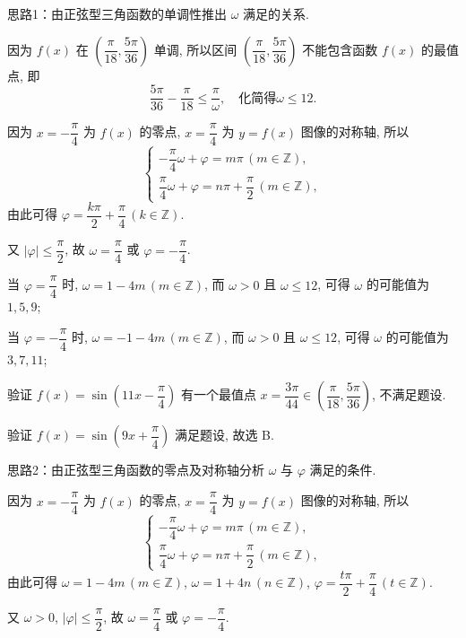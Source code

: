 \begin{solutions}
思路1：由正弦型三角函数的单调性推出 $ \omega $ 满足的关系.  

因为 $ f(x) $ 在 $ \left(\dfrac{\pi}{18},\dfrac{5\pi}{36}\right) $ 单调, 所以区间 $ \left(\dfrac{\pi}{18},\dfrac{5\pi}{36}\right) $ 不能包含函数 $ f(x) $ 的最值点, 即  
$$
\dfrac{5\pi}{36}-\dfrac{\pi}{18}\leqslant\dfrac{\pi}{\omega},\quad\text{化简得}\omega\leqslant12.
$$  

因为 $ x=-\dfrac{\pi}{4} $ 为 $ f(x) $ 的零点, $ x=\dfrac{\pi}{4} $ 为 $ y=f(x) $ 图像的对称轴, 所以  
$$
\begin{cases}
-\dfrac{\pi}{4}\omega+\varphi=m\pi\,(m\in\mathbb{Z}),\\[1em]
\dfrac{\pi}{4}\omega+\varphi=n\pi+\dfrac{\pi}{2}\,(m\in\mathbb{Z}),
\end{cases}
$$  
由此可得 $ \varphi=\dfrac{k\pi}{2}+\dfrac{\pi}{4}\,(k\in\mathbb{Z}) $.  

又 $ |\varphi|\leqslant\dfrac{\pi}{2} $, 故 $ \omega=\dfrac{\pi}{4} $ 或 $ \varphi=-\dfrac{\pi}{4} $.  

当 $ \varphi=\dfrac{\pi}{4} $ 时, $ \omega=1-4m\,(m\in\mathbb{Z}) $, 而 $ \omega>0 $ 且 $ \omega\leqslant12 $, 可得 $ \omega $ 的可能值为 $ 1,5,9 $;  

当 $ \varphi=-\dfrac{\pi}{4} $ 时, $ \omega=-1-4m\,(m\in\mathbb{Z}) $, 而 $ \omega>0 $ 且 $ \omega\leqslant12 $, 可得 $ \omega $ 的可能值为 $ 3,7,11 $;  

验证 $ f(x)=\sin\left(11x-\dfrac{\pi}{4}\right) $ 有一个最值点 $ x=\dfrac{3\pi}{44}\in\left(\dfrac{\pi}{18},\dfrac{5\pi}{36}\right) $, 不满足题设.  

验证 $ f(x)=\sin\left(9x+\dfrac{\pi}{4}\right) $ 满足题设, 故选 B.  

思路2：由正弦型三角函数的零点及对称轴分析 $ \omega $ 与 $ \varphi $ 满足的条件.  

因为 $ x=-\dfrac{\pi}{4} $ 为 $ f(x) $ 的零点, $ x=\dfrac{\pi}{4} $ 为 $ y=f(x) $ 图像的对称轴, 所以  
$$
\begin{cases}
-\dfrac{\pi}{4}\omega+\varphi=m\pi\,(m\in\mathbb{Z}),\\[1em]
\dfrac{\pi}{4}\omega+\varphi=n\pi+\dfrac{\pi}{2}\,(m\in\mathbb{Z}),
\end{cases}
$$  
由此可得 $ \omega=1-4m\,(m\in\mathbb{Z}) $, $ \omega=1+4n\,(n\in\mathbb{Z}) $, $ \varphi=\dfrac{t\pi}{2}+\dfrac{\pi}{4}\,(t\in\mathbb{Z}) $.  

又 $ \omega>0 $, $ |\varphi|\leqslant\dfrac{\pi}{2} $, 故 $ \omega=\dfrac{\pi}{4} $ 或 $ \varphi=-\dfrac{\pi}{4} $.  


\end{solutions}
